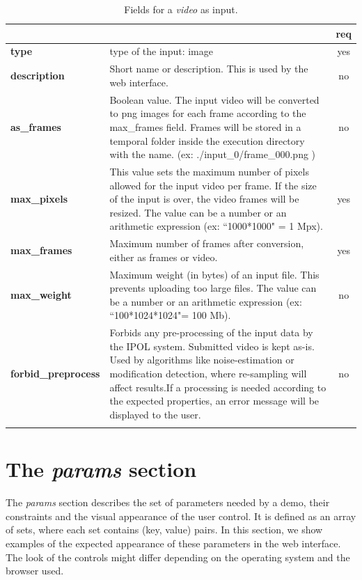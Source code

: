 \begin{longtable}{|>{\bf}L{\linewidth}|L{\linewidth}|c|}
\hline
{}     &  & {\bf req} \tabularnewline 
\hline \hline
 type         & type of the input: image & yes \\ \hline
 description  & Short name or description. This is used by the web interface. & no \\ \hline
 as\_frames & Boolean value. The input video will be converted to png images for each frame according to the max\_frames field. Frames
 will be stored in a temporal folder inside the execution directory with the name. (ex: ./input\_0/frame\_000.png ) & no \\ \hline
 max\_pixels   & This value sets the maximum number of pixels allowed for the input video per frame. If the size of the input is over, the video frames will be resized. The value can be a number or an arithmetic expression (ex: ``1000*1000" = 1 Mpx).  & yes \\ \hline 
 max\_frames  &  Maximum number of frames after conversion, either as frames or video.  & yes \\ \hline
 max\_weight   & Maximum weight (in bytes) of an input file. This prevents uploading too large files. The value can be a number or an arithmetic expression (ex: ``100*1024*1024"= 100 Mb). & no \\ \hline
forbid\_preprocess & Forbids any pre-processing of the input data by the IPOL system. Submitted video is kept as-is. Used by algorithms like noise-estimation or modification detection, where re-sampling will affect results.If a processing is needed according to the expected properties, an error message will be displayed to the user.
& no \\ \hline
\caption{Fields for a \emph{video} as input.}
\end{longtable}

\section{The \emph{params} section}
The \emph{params} section describes the set of parameters needed by a demo, their constraints and the visual appearance of the user control. It is defined as an array of sets, where each set contains (key, value) pairs. In this section, we show examples of the expected appearance of these parameters in the web interface. The look of the controls might differ depending on the operating system and the browser used.

